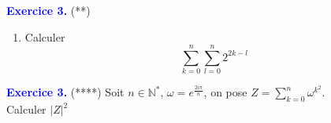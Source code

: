 \documentclass[a4paper,10pt]{article}
\begin{document}
\begin{multicols}{4}
\textcolor{blue}{\large{\bf Exercice 3.}} (**)
\begin{enumerate}
\item Calculer $$\displaystyle\sum_{k=0}^{n}{\displaystyle\sum_{l=0}^{n}{2^{2k-l}}}$$
\end{enumerate}

\textcolor{blue}{\large{\bf Exercice 3.}} (****)
Soit $n \in \mathbb{N}^{*}$, $\omega = e^{\frac{2 i \pi}{n}}$, on pose $Z = \displaystyle\sum_{k=0}^{n}{\omega^{k^2}}$. \\
Calculer $|Z|^{2}$

\end{multicols}
\end{document}
